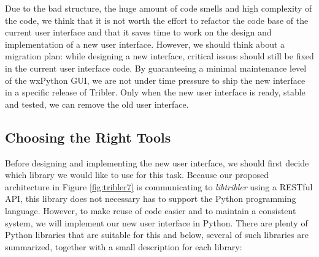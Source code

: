 Due to the bad structure, the huge amount of code smells and high complexity of the code, we think that it is not worth the effort to refactor the code base of the current user interface and that it saves time to work on the design and implementation of a new user interface. However, we should think about a migration plan: while designing a new interface, critical issues should still be fixed in the current user interface code. By guaranteeing a minimal maintenance level of the wxPython GUI, we are not under time pressure to ship the new interface in a specific release of Tribler. Only when the new user interface is ready, stable and tested, we can remove the old user interface.

\subsection{Choosing the Right Tools}
Before designing and implementing the new user interface, we should first decide which library we would like to use for this task. Because our proposed architecture in Figure \ref{fig:tribler7} is communicating to \emph{libtribler} using a RESTful API, this library does not necessary has to support the Python programming language. However, to make reuse of code easier and to maintain a consistent system, we will implement our new user interface in Python. There are plenty of Python libraries that are suitable for this and below, several of such libraries are summarized, together with a small description for each library:
